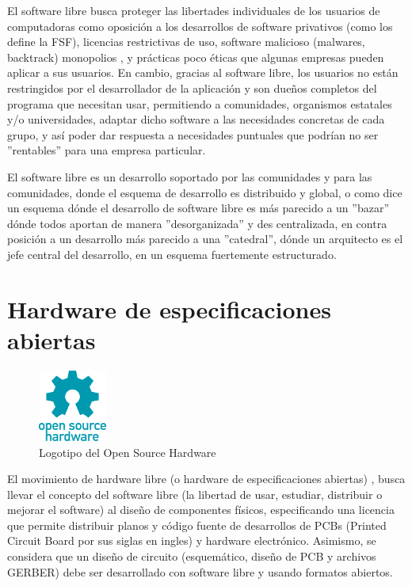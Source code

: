 El software libre busca proteger las libertades individuales de los usuarios de computadoras como oposición a los desarrollos de software privativos (como los define la FSF), licencias restrictivas de uso, software malicioso (malwares, backtrack) monopolios \citep{beatriz_busaniche_argentina_2010}, y prácticas poco éticas que algunas empresas pueden aplicar a sus usuarios. En cambio, gracias al software libre, los usuarios no están restringidos por el desarrollador de la aplicación y son dueños completos del programa que necesitan usar, permitiendo a comunidades, organismos estatales y/o universidades, adaptar dicho software a las necesidades concretas de cada grupo, y así poder dar respuesta a necesidades puntuales que podrían no ser ''rentables'' para una empresa particular.

El software libre es un desarrollo soportado por las comunidades y para las comunidades, donde el esquema de desarrollo es distribuido y global, o como dice \citep{raymond_catedral_1998} un esquema dónde el desarrollo de software libre es más parecido a un ''bazar'' dónde todos aportan de manera ''desorganizada'' y des centralizada, en contra posición a un desarrollo más parecido a una ''catedral'', dónde un arquitecto es el jefe central del desarrollo, en un esquema fuertemente estructurado.

\section{Hardware de especificaciones abiertas }

\begin{figure}
  \begin{center}
    \includegraphics[width=0.2\textwidth]{figuras/Open-source-hardware-logo.png}
    \caption{Logotipo del Open Source Hardware}
    \label{fig: }
  \end{center}
\end{figure}

El movimiento de hardware libre (o hardware de especificaciones abiertas) , busca llevar el concepto del software libre (la libertad de usar, estudiar, distribuir o mejorar el software) al diseño de  componentes físicos, especificando una licencia que permite distribuir planos y código fuente de desarrollos de PCBs (Printed Circuit Board por sus siglas en ingles) y hardware electrónico. Asimismo, se considera que un diseño de circuito (esquemático, diseño de PCB y archivos GERBER) debe ser desarrollado con software libre y usando formatos abiertos.

